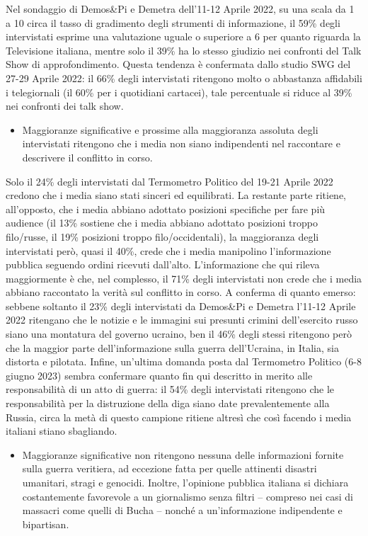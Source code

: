 \documentclass[
]{book}
\providecommand{\tightlist}{%
  \setlength{\itemsep}{0pt}\setlength{\parskip}{0pt}}
\begin{document}
Nel sondaggio di Demos\&Pi e Demetra dell'11-12 Aprile 2022, su una scala da 1 a 10 circa il tasso di gradimento degli strumenti di informazione, il 59\% degli intervistati esprime una valutazione uguale o superiore a 6 per quanto riguarda la Televisione italiana, mentre solo il 39\% ha lo stesso giudizio nei confronti del Talk Show di approfondimento. Questa tendenza è confermata dallo studio SWG del 27-29 Aprile 2022: il 66\% degli intervistati ritengono molto o abbastanza affidabili i telegiornali (il 60\% per i quotidiani cartacei), tale percentuale si riduce al 39\% nei confronti dei talk show.

\begin{itemize}
\tightlist
\item
  Maggioranze significative e prossime alla maggioranza assoluta degli intervistati ritengono che i media non siano indipendenti nel raccontare e descrivere il conflitto in corso.
\end{itemize}

Solo il 24\% degli intervistati dal Termometro Politico del 19-21 Aprile 2022 credono che i media siano stati sinceri ed equilibrati. La restante parte ritiene, all'opposto, che i media abbiano adottato posizioni specifiche per fare più audience (il 13\% sostiene che i media abbiano adottato posizioni troppo filo/russe, il 19\% posizioni troppo filo/occidentali), la maggioranza degli intervistati però, quasi il 40\%, crede che i media manipolino l'informazione pubblica seguendo ordini ricevuti dall'alto. L'informazione che qui rileva maggiormente è che, nel complesso, il 71\% degli intervistati non crede che i media abbiano raccontato la verità sul conflitto in corso. A conferma di quanto emerso: sebbene soltanto il 23\% degli intervistati da Demos\&Pi e Demetra l'11-12 Aprile 2022 ritengano che le notizie e le immagini sui presunti crimini dell'esercito russo siano una montatura del governo ucraino, ben il 46\% degli stessi ritengono però che la maggior parte dell'informazione sulla guerra dell'Ucraina, in Italia, sia distorta e pilotata. Infine, un'ultima domanda posta dal Termometro Politico (6-8 giugno 2023) sembra confermare quanto fin qui descritto in merito alle responsabilità di un atto di guerra: il 54\% degli intervistati ritengono che le responsabilità per la distruzione della diga siano date prevalentemente alla Russia, circa la metà di questo campione ritiene altresì che così facendo i media italiani stiano sbagliando.

\begin{itemize}
\tightlist
\item
  Maggioranze significative non ritengono nessuna delle informazioni fornite sulla guerra veritiera, ad eccezione fatta per quelle attinenti disastri umanitari, stragi e genocidi. Inoltre, l'opinione pubblica italiana si dichiara costantemente favorevole a un giornalismo senza filtri -- compreso nei casi di massacri come quelli di Bucha -- nonché a un'informazione indipendente e bipartisan.
\end{itemize}
\end{document}
